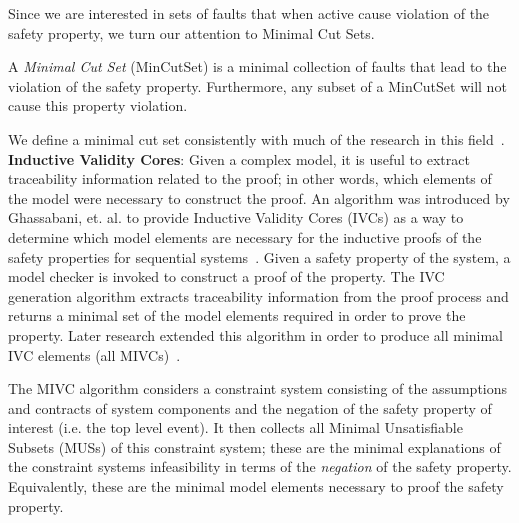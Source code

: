 Since we are interested in sets of faults that when active cause violation of the safety property, we turn our attention to Minimal Cut Sets. 
\begin{definition}
A \textit{Minimal Cut Set} (MinCutSet) is a minimal collection of faults that lead to the violation of the safety property. Furthermore, any subset of a MinCutSet will not cause this property violation. 
\end{definition}
We define a minimal cut set consistently with much of the research in this field~\cite{0f356f05e72f43018211b36f97c8854a,historyFTA}.\\

\textbf{Inductive Validity Cores}: Given a complex model, it is useful to extract traceability information related to the proof; in other words, which elements of the model were necessary to construct the proof. An algorithm was introduced by Ghassabani, et. al. to provide Inductive Validity Cores (IVCs) as a way to determine which model elements are necessary for the inductive proofs of the safety properties for sequential systems~\cite{GhassabaniGW16}. Given a safety property of the system, a model checker is invoked to construct a proof of the property. The IVC generation algorithm extracts traceability information from the proof process and returns a minimal set of the model elements required in order to prove the property. Later research extended this algorithm in order to produce all minimal IVC elements (all MIVCs)~\cite{Ghassabani2017EfficientGO,bendik2018online}. 

The MIVC algorithm considers a constraint system consisting of the assumptions and contracts of system components and the negation of the safety property of interest (i.e. the top level event). It then collects all Minimal Unsatisfiable Subsets (MUSs) of this constraint system; these are the minimal explanations of the constraint systems infeasibility in terms of the \textit{negation} of the safety property. Equivalently, these are the minimal model elements necessary to proof the safety property.%





